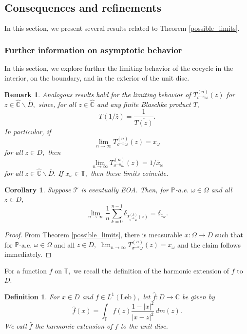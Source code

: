 \documentclass[12pt,reqno]{amsart}
\numberwithin{theorem}{section}
\newtheorem{definition}[theorem]{Definition}%
\newtheorem{remark}[theorem]{Remark}%
\newtheorem{corollary}[theorem]{Corollary}
\begin{document}
\subsection{Consequences and refinements}
In this section, we present several results related to Theorem \ref{possible_limits}.

\subsubsection{Further information on asymptotic behavior}

In this section, we explore further the limiting behavior of the cocycle in the interior, on the boundary, and in the exterior of the unit disc.

\begin{remark}
    Analogous results hold for the limiting behavior of $T_{\sigma^{-n}\omega}^{(n)}(z)$ for  $z\in\hat{\mathbb{C}}\backslash\overline{D},$ since, for all $z\in\hat{\mathbb{C}}$ and any finite Blaschke product $T,$ $$T(1/\bar{z})=\frac{1}{\overline{T(z)}}.$$ In particular, if $$\lim_{n\to\infty}T_{\sigma^{-n}\omega}^{(n)}(z)=x_{\omega}$$ for all $z\in D,$ then $$\lim_{n\to\infty}T_{\sigma^{-n}\omega}^{(n)}(z)=1/\bar{x}_{\omega}$$ for all $z\in\hat{\mathbb{C}}\backslash\overline{D}.$ 
    If $x_{\omega}\in\mathbb{T},$ then these limits coincide.
\end{remark}

\begin{corollary}
    Suppose $\mathcal{T}$ is eventually EOA. Then, for $\mathbb{P}$-a.e. $\omega\in\Omega$ and all $z\in D,$ $$\lim_{n\to\infty}\frac{1}{n}\sum_{k=0}^{n-1}\delta_{T_{\sigma^{-k}\omega}^{(k)}(z)}=\delta_{x_{\omega}}.$$
\end{corollary}
\begin{proof}
    From Theorem \ref{possible_limits}, there is measurable $x:\Omega\to D$ such that for $\mathbb{P}$-a.e. $\omega\in\Omega$ and all $z\in D,$ $\lim_{n\to\infty}T_{\sigma^{-n}\omega}^{(n)}(z)=x_{\omega}$ and the claim follows immediately.
\end{proof}

For a function $f$ on $\mathbb{T},$ we recall the definition of the harmonic extension of $f$ to $D.$
\begin{definition}\label{harmonic_extension}
    For $x\in D$ and $f\in L^{1}(\text{Leb}),$ let $\hat{f}:D\to\mathbb{C}$ be given by $$\hat{f}(x)=\int_{\mathbb{T}}f(z)\frac{1-|x|^{2}}{|x-z|^{2}}\,dm(z).$$ We call $\hat{f}$ the harmonic extension of $f$ to the unit disc.
\end{definition}
\end{document}
